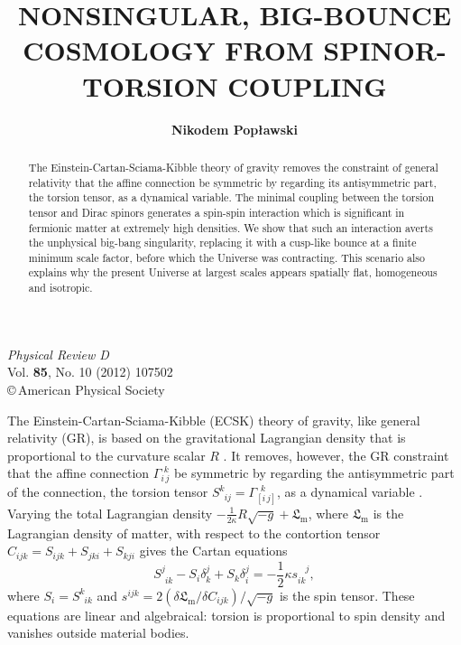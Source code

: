 \documentclass[prd,onecolumn,nofootinbib,showpacs]{revtex4}
\begin{document}
\title{NONSINGULAR, BIG-BOUNCE COSMOLOGY FROM SPINOR-TORSION COUPLING}

\author{{\bf Nikodem Pop{\l}awski}}


\noindent
{\em Physical Review D}\\
Vol. {\bf 85}, No. 10 (2012) 107502\\
\copyright\,American Physical Society
\vspace{0.4in}

\begin{abstract}
The Einstein-Cartan-Sciama-Kibble theory of gravity removes the constraint of general relativity that the affine connection be symmetric by regarding its antisymmetric part, the torsion tensor, as a dynamical variable.
The minimal coupling between the torsion tensor and Dirac spinors generates a spin-spin interaction which is significant in fermionic matter at extremely high densities.
We show that such an interaction averts the unphysical big-bang singularity, replacing it with a cusp-like bounce at a finite minimum scale factor, before which the Universe was contracting.
This scenario also explains why the present Universe at largest scales appears spatially flat, homogeneous and isotropic.
\end{abstract}


\maketitle


The Einstein-Cartan-Sciama-Kibble (ECSK) theory of gravity, like general relativity (GR), is based on the gravitational Lagrangian density that is proportional to the curvature scalar $R$ \cite{LL}.
It removes, however, the GR constraint that the affine connection $\Gamma^{\,\,k}_{i\,j}$ be symmetric by regarding the antisymmetric part of the connection, the torsion tensor $S^k_{\phantom{k}ij}=\Gamma^{\,\,\,k}_{[i\,j]}$, as a dynamical variable \cite{KS}.
Varying the total Lagrangian density $-\frac{1}{2\kappa}R\sqrt{-g}+\mathfrak{L}_\textrm{m}$, where $\mathfrak{L}_\textrm{m}$ is the Lagrangian density of matter, with respect to the contortion tensor $C_{ijk}=S_{ijk}+S_{jki}+S_{kji}$ gives the Cartan equations
\begin{equation}
S^j_{\phantom{j}ik}-S_i \delta^j_k+S_k \delta^j_i=-\frac{1}{2}\kappa s^{\phantom{ik}j}_{ik},
\label{Cartan}
\end{equation}
where $S_i=S^k_{\phantom{k}ik}$ and $s^{ijk}=2(\delta\mathfrak{L}_\textrm{m}/\delta C_{ijk})/\sqrt{-g}$ is the spin tensor.
These equations are linear and algebraical: torsion is proportional to spin density and vanishes outside material bodies.
\end{document}
